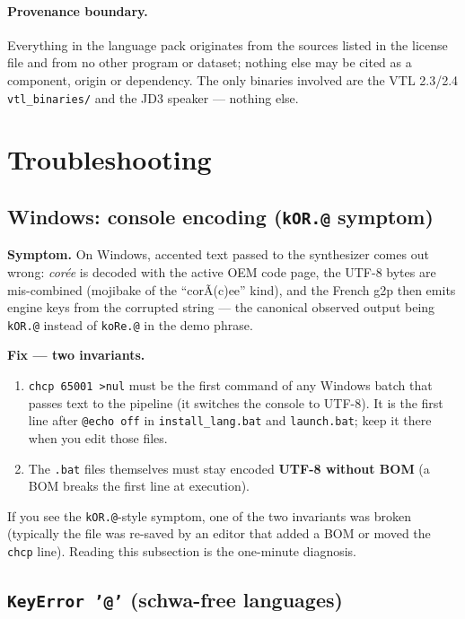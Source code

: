 \documentclass[11pt,a4paper]{article}
\newcommand{\code}[1]{\texttt{#1}}
\newcommand{\sampkey}[1]{\texttt{#1}}
\begin{document}
\paragraph{Provenance boundary.} Everything in the language pack
originates from the sources listed in the license file and from no
other program or dataset; nothing else may be cited as a component,
origin or dependency. The only binaries involved are the
VTL 2.3/2.4 \code{vtl\_binaries/} and the JD3 speaker --- nothing
else.

\section{Troubleshooting}
\label{sec:trouble}

\subsection{Windows: console encoding (\code{kOR.@} symptom)}

\textbf{Symptom.} On Windows, accented text passed to the synthesizer
comes out wrong: \emph{cor\'ee} is decoded with the active OEM code
page, the UTF-8 bytes are mis-combined (mojibake of the
``cor\~A(c)ee'' kind), and the French g2p then emits engine keys from
the corrupted string --- the canonical observed output being
\sampkey{kOR.@} instead of \sampkey{koRe.@} in the demo phrase.

\textbf{Fix --- two invariants.}
\begin{enumerate}
\item \code{chcp 65001 >nul} must be the first command of any
      Windows batch that passes text to the pipeline (it switches the
      console to UTF-8). It is the first line after \code{@echo off}
      in \code{install\_lang.bat} and \code{launch.bat}; keep it
      there when you edit those files.
\item The \code{.bat} files themselves must stay encoded
      \textbf{UTF-8 without BOM} (a BOM breaks the first line at
      execution).
\end{enumerate}
If you see the \sampkey{kOR.@}-style symptom, one of the two
invariants was broken (typically the file was re-saved by an editor
that added a BOM or moved the \code{chcp} line). Reading this
subsection is the one-minute diagnosis.

\subsection{\code{KeyError '@'} (schwa-free languages)}
\end{document}
